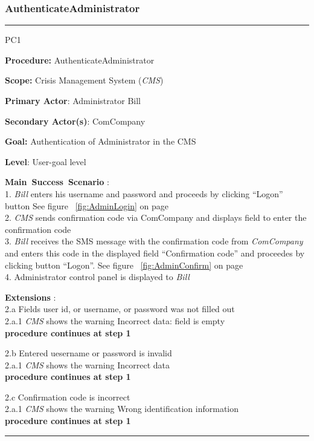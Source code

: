 \subsubsection{AuthenticateAdministrator}

\vspace{0.5cm}
\hrule
\begin{lyxlist}{PC1}
\small{
\item [\textbf{Procedure:}] AuthenticateAdministrator
\item [\textbf{Scope:}] Crisis Management System (\emph{CMS})
\item [\textbf{Primary Actor}:] Administrator Bill
\item [\textbf{Secondary Actor(s)}:] ComCompany
\item [\textbf{Goal:}] Authentication of Administrator in the CMS
\item [\textbf{Level}:] User-goal level
\item [\textbf{Main~Success~Scenario}]:\\
1. \emph{Bill} enters his username and password and proceeds by clicking
``Logon'' button
See figure ~\ref{fig:AdminLogin} on page~\pageref{fig:AdminLogin}\\
2. \emph{CMS} sends confirmation code via ComCompany and displays field to enter
the confirmation code \\
3. \emph{Bill} receives the SMS message with the confirmation code from
\emph{ComCompany} and enters this code in the displayed field ``Confirmation
code'' and proceedes by clicking button ``Logon''. See figure ~\ref{fig:AdminConfirm}
on page ~\pageref{fig:AdminConfirm}\\
4. Administrator control panel is displayed to \emph{Bill} 

\item [\textbf{Extensions}]:\\
2.a Fields user id, or username, or password was not filled out\\
\hspace*{0.5cm} 2.a.1 \emph{CMS} shows the warning Incorrect data: field is
empty\\
\hspace*{0.5cm} \textbf{procedure continues at step 1}

2.b Entered uesername or password is invalid\\
\hspace*{0.5cm} 2.a.1 \emph{CMS} shows the warning Incorrect data\\
\hspace*{0.5cm} \textbf{procedure continues at step 1}

2.c Confirmation code is incorrect\\
\hspace*{0.5cm} 2.a.1 \emph{CMS} shows the warning Wrong identification information\\
\hspace*{0.5cm} \textbf{procedure continues at step 1}

}
\end{lyxlist}
\hrule
\vspace{0.5cm}


